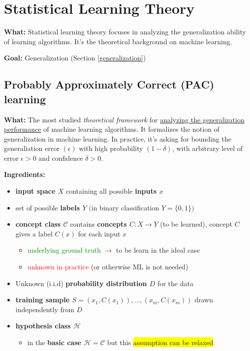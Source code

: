 \documentclass[12pt, a4paper]{article}
\let\stdsection\section
\renewcommand\section{\newpage\stdsection} %
\begin{document}
\section{Statistical Learning Theory
}\label{statistical-learning-theory}

\textbf{What:} Statistical learning theory focuses in analyzing the generalization ability of learning algorithms. It's the theoretical background on machine learning.

\textbf{Goal:} Generalization (Section \ref{generalization})






\subsection{Probably Approximately Correct (PAC) learning
}\label{probably-approximately-correct-pac-learning}

\textbf{What:} The most studied \emph{theoretical framework} for \uline{analyzing the generalization performance} of machine learning algorithms. It formalizes the notion of generalization in machine learning. In practice, it's asking for bounding the generaliation error $(\epsilon)$ with high probability $(1 - \delta)$, with arbitrary level of error $\epsilon > 0$ and confidence $\delta > 0$.

\textbf{Ingredients:}

\begin{itemize}
  \item
    \textbf{input space $X$} containing all possible \textbf{inputs $x$}
  \item
    set of possible \textbf{labels $Y$} $($in binary
    classification $Y = \{0, 1\}$$)$
  \item
    \textbf{concept class $\mathcal{C}$} contains \textbf{concepts $C : X \rightarrow Y$} (to be learned),
    concept $C$ gives a label $C(x)$ for each input $x$
    \begin{itemize}
      \item \textcolor{Green}{underlying ground truth} $\rightarrow$ to be learn in the ideal case
      \item \textcolor{Red}{unknown in practice} (or otherwise ML is not needed)
    \end{itemize}
  \item Unknown (i.i.d) \textbf{probability distribution $D$} for the data
  \item \textbf{training sample $S = (x_1,C(x_1)),...,(x_m,C(x_m))$} drawn independently from $D$
  \item \textbf{hypothesis class $\mathcal{H}$}
  \begin{itemize}
    \item in the \textbf{basic case $\mathcal{H} = \mathcal{C}$} but this \colorbox{Yellow}{assumption can be relaxed}
  \end{itemize}
\end{itemize}
\end{document}
